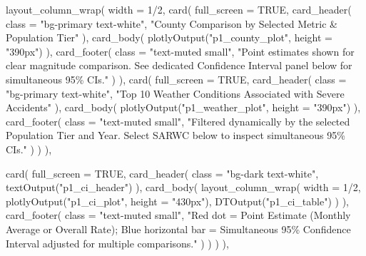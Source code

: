 \documentclass[
  letterpaper,
  DIV=11,
  numbers=noendperiod]{scrartcl}
\newenvironment{Shaded}{\begin{snugshade}}{\end{snugshade}}
\newcommand{\AttributeTok}[1]{\textcolor[rgb]{0.40,0.45,0.13}{#1}}
\newcommand{\ConstantTok}[1]{\textcolor[rgb]{0.56,0.35,0.01}{#1}}
\newcommand{\DecValTok}[1]{\textcolor[rgb]{0.68,0.00,0.00}{#1}}
\newcommand{\FunctionTok}[1]{\textcolor[rgb]{0.28,0.35,0.67}{#1}}
\newcommand{\NormalTok}[1]{\textcolor[rgb]{0.00,0.23,0.31}{#1}}
\newcommand{\SpecialCharTok}[1]{\textcolor[rgb]{0.37,0.37,0.37}{#1}}
\newcommand{\StringTok}[1]{\textcolor[rgb]{0.13,0.47,0.30}{#1}}
\begin{document}
\begin{Shaded}
\begin{Highlighting}[]
      \FunctionTok{layout\_column\_wrap}\NormalTok{(}
        \AttributeTok{width =} \DecValTok{1}\SpecialCharTok{/}\DecValTok{2}\NormalTok{,}
        \FunctionTok{card}\NormalTok{(}
          \AttributeTok{full\_screen =} \ConstantTok{TRUE}\NormalTok{,}
          \FunctionTok{card\_header}\NormalTok{(}
            \AttributeTok{class =} \StringTok{"bg{-}primary text{-}white"}\NormalTok{,}
            \StringTok{"County Comparison by Selected Metric \& Population Tier"}
\NormalTok{          ),}
          \FunctionTok{card\_body}\NormalTok{(}
            \FunctionTok{plotlyOutput}\NormalTok{(}\StringTok{"p1\_county\_plot"}\NormalTok{, }\AttributeTok{height =} \StringTok{"390px"}\NormalTok{)}
\NormalTok{          ),}
          \FunctionTok{card\_footer}\NormalTok{(}
            \AttributeTok{class =} \StringTok{"text{-}muted small"}\NormalTok{,}
            \StringTok{"Point estimates shown for clear magnitude comparison. See dedicated Confidence Interval panel below for simultaneous 95\% CIs."}
\NormalTok{          )}
\NormalTok{        ),}
        \FunctionTok{card}\NormalTok{(}
          \AttributeTok{full\_screen =} \ConstantTok{TRUE}\NormalTok{,}
          \FunctionTok{card\_header}\NormalTok{(}
            \AttributeTok{class =} \StringTok{"bg{-}primary text{-}white"}\NormalTok{,}
            \StringTok{"Top 10 Weather Conditions Associated with Severe Accidents"}
\NormalTok{          ),}
          \FunctionTok{card\_body}\NormalTok{(}
            \FunctionTok{plotlyOutput}\NormalTok{(}\StringTok{"p1\_weather\_plot"}\NormalTok{, }\AttributeTok{height =} \StringTok{"390px"}\NormalTok{)}
\NormalTok{          ),}
          \FunctionTok{card\_footer}\NormalTok{(}
            \AttributeTok{class =} \StringTok{"text{-}muted small"}\NormalTok{,}
            \StringTok{"Filtered dynamically by the selected Population Tier and Year. Select \textquotesingle{}SARWC\textquotesingle{} below to inspect simultaneous 95\% CIs."}
\NormalTok{          )}
\NormalTok{        )}
\NormalTok{      ),}

      \FunctionTok{card}\NormalTok{(}
        \AttributeTok{full\_screen =} \ConstantTok{TRUE}\NormalTok{,}
        \FunctionTok{card\_header}\NormalTok{(}
          \AttributeTok{class =} \StringTok{"bg{-}dark text{-}white"}\NormalTok{,}
          \FunctionTok{textOutput}\NormalTok{(}\StringTok{"p1\_ci\_header"}\NormalTok{)}
\NormalTok{        ),}
        \FunctionTok{card\_body}\NormalTok{(}
          \FunctionTok{layout\_column\_wrap}\NormalTok{(}
            \AttributeTok{width =} \DecValTok{1}\SpecialCharTok{/}\DecValTok{2}\NormalTok{,}
            \FunctionTok{plotlyOutput}\NormalTok{(}\StringTok{"p1\_ci\_plot"}\NormalTok{, }\AttributeTok{height =} \StringTok{"430px"}\NormalTok{),}
            \FunctionTok{DTOutput}\NormalTok{(}\StringTok{"p1\_ci\_table"}\NormalTok{)}
\NormalTok{          )}
\NormalTok{        ),}
        \FunctionTok{card\_footer}\NormalTok{(}
          \AttributeTok{class =} \StringTok{"text{-}muted small"}\NormalTok{,}
          \StringTok{"Red dot = Point Estimate (Monthly Average or Overall Rate); Blue horizontal bar = Simultaneous 95\% Confidence Interval adjusted for multiple comparisons."}
\NormalTok{        )}
\NormalTok{      )}
\NormalTok{    )}
\NormalTok{  ),}


\end{Highlighting}
\end{Shaded}
\end{document}
